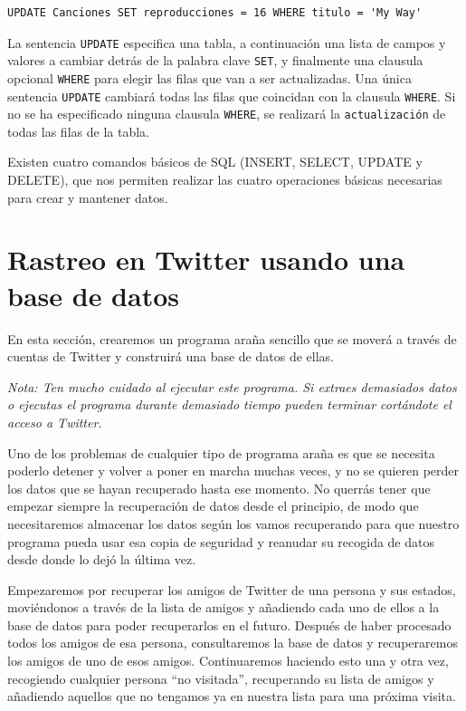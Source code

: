 \beforeverb
\begin{verbatim}
UPDATE Canciones SET reproducciones = 16 WHERE titulo = 'My Way'
\end{verbatim}
\afterverb
%
La sentencia {\tt UPDATE} especifica una tabla, a continuación
una lista de campos y valores a cambiar detrás de la palabra
clave {\tt SET}, y finalmente una clausula opcional {\tt WHERE} para elegir
las filas que van a ser actualizadas. Una única sentencia {\tt UPDATE}
cambiará todas las filas que coincidan con la clausula {\tt WHERE}.
Si no se ha especificado ninguna clausula {\tt WHERE}, se realizará la
{\tt actualización} de todas las filas de la tabla.

Existen cuatro comandos básicos de SQL (INSERT, SELECT, UPDATE y DELETE), que
nos permiten realizar las cuatro operaciones básicas necesarias para crear y mantener datos.

\section{Rastreo en Twitter usando una base de datos}

En esta sección, crearemos un programa araña sencillo que se moverá
a través de cuentas de Twitter y construirá una base de datos de ellas.

\emph{Nota: Ten mucho cuidado al ejecutar este programa. Si extraes
demasiados datos o ejecutas el programa durante demasiado tiempo
pueden terminar cortándote el acceso a Twitter.}

Uno de los problemas de cualquier tipo de programa araña es que se
necesita poderlo detener y volver a poner en marcha muchas veces, y
no se quieren perder los datos que se hayan recuperado hasta ese momento.
No querrás tener que empezar siempre la recuperación de datos desde
el principio, de modo que necesitaremos almacenar los datos según los vamos recuperando para
que nuestro programa pueda usar esa copia de seguridad y reanudar su recogida de datos
desde donde lo dejó la última vez.

Empezaremos por recuperar los amigos de Twitter de una persona y sus estados,
moviéndonos a través de la lista de amigos y añadiendo cada uno de ellos
a la base de datos para poder recuperarlos en el futuro. Después
de haber procesado todos los amigos de esa persona, consultaremos la base de datos
y recuperaremos los amigos de uno de esos amigos. Continuaremos haciendo esto una y otra vez,
recogiendo cualquier persona ``no visitada'', recuperando su lista de amigos
y añadiendo aquellos que no tengamos ya en nuestra lista para una próxima visita.

